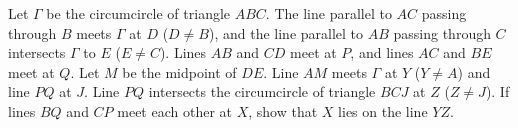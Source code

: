 Let $\Gamma$ be the circumcircle of triangle $ABC$. The line parallel to $AC$ passing through $B$ meets $\Gamma$ at $D$ ($D\neq B$), and the line parallel to $AB$ passing through $C$ intersects $\Gamma$ to $E$ ($E\neq C$). Lines $AB$ and $CD$ meet at $P$,  and lines $AC$ and $BE$ meet at $Q$. Let $M$ be the midpoint of $DE$. Line $AM$ meets $\Gamma$ at $Y$ ($Y\neq A$) and line $PQ$ at $J$. Line $PQ$ intersects the circumcircle of triangle $BCJ$ at $Z$ ($Z\neq J$). If lines $BQ$ and $CP$ meet each other at $X$,  show that $X$ lies on the line $YZ$.